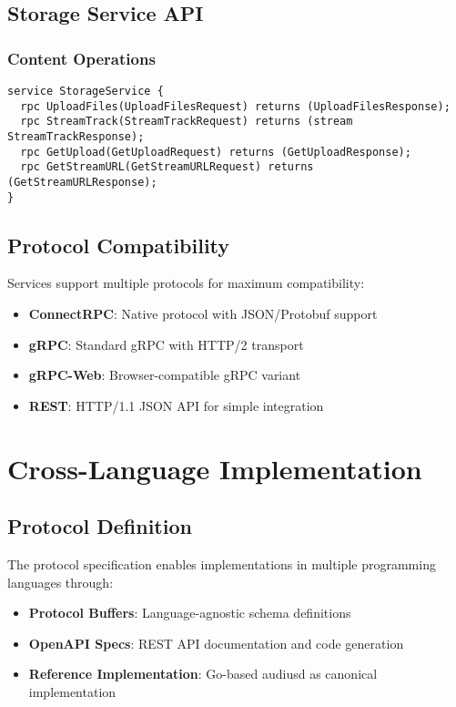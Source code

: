 \documentclass[11pt,a4paper]{article}
\begin{document}
\subsection{Storage Service API}

\subsubsection{Content Operations}
\begin{lstlisting}[caption=Storage Service Methods]
service StorageService {
  rpc UploadFiles(UploadFilesRequest) returns (UploadFilesResponse);
  rpc StreamTrack(StreamTrackRequest) returns (stream StreamTrackResponse);
  rpc GetUpload(GetUploadRequest) returns (GetUploadResponse);
  rpc GetStreamURL(GetStreamURLRequest) returns (GetStreamURLResponse);
}
\end{lstlisting}

\subsection{Protocol Compatibility}

Services support multiple protocols for maximum compatibility:

\begin{itemize}
  \item \textbf{ConnectRPC}: Native protocol with JSON/Protobuf support
  \item \textbf{gRPC}: Standard gRPC with HTTP/2 transport
  \item \textbf{gRPC-Web}: Browser-compatible gRPC variant
  \item \textbf{REST}: HTTP/1.1 JSON API for simple integration
\end{itemize}

\section{Cross-Language Implementation}

\subsection{Protocol Definition}

The protocol specification enables implementations in multiple programming languages through:

\begin{itemize}
  \item \textbf{Protocol Buffers}: Language-agnostic schema definitions
  \item \textbf{OpenAPI Specs}: REST API documentation and code generation
  \item \textbf{Reference Implementation}: Go-based audiusd as canonical implementation
\end{itemize}
\end{document}
